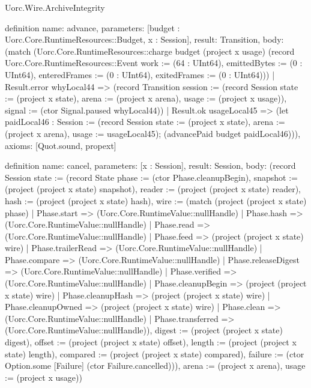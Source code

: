 \begin{lexlean}{Uorc.Wire.ArchiveIntegrity}
\begin{semanticmodule}
definition{
  name: advance,
  parameters: [budget : Uorc.Core.RuntimeResources::Budget, x : Session],
  result: Transition,
  body: (match (Uorc.Core.RuntimeResources::charge budget (project x usage) (record Uorc.Core.RuntimeResources::Event {work := (64 : UInt64), emittedBytes := (0 : UInt64), enteredFrames := (0 : UInt64), exitedFrames := (0 : UInt64)}))
    | Result.error whyLocal44 => (record Transition {session := (record Session {state := (project x state), arena := (project x arena), usage := (project x usage)}), signal := (ctor Signal.paused whyLocal44)})
    | Result.ok usageLocal45 => (let paidLocal46 : Session := (record Session {state := (project x state), arena := (project x arena), usage := usageLocal45}); (advancePaid budget paidLocal46))),
  axioms: [Quot.sound, propext]
}

definition{
  name: cancel,
  parameters: [x : Session],
  result: Session,
  body: (record Session {state := (record State {phase := (ctor Phase.cleanupBegin), snapshot := (project (project x state) snapshot), reader := (project (project x state) reader), hash := (project (project x state) hash), wire := (match (project (project x state) phase)
    | Phase.start => (Uorc.Core.RuntimeValue::nullHandle)
    | Phase.hash => (Uorc.Core.RuntimeValue::nullHandle)
    | Phase.read => (Uorc.Core.RuntimeValue::nullHandle)
    | Phase.feed => (project (project x state) wire)
    | Phase.trailerRead => (Uorc.Core.RuntimeValue::nullHandle)
    | Phase.compare => (Uorc.Core.RuntimeValue::nullHandle)
    | Phase.releaseDigest => (Uorc.Core.RuntimeValue::nullHandle)
    | Phase.verified => (Uorc.Core.RuntimeValue::nullHandle)
    | Phase.cleanupBegin => (project (project x state) wire)
    | Phase.cleanupHash => (project (project x state) wire)
    | Phase.cleanupOwned => (project (project x state) wire)
    | Phase.clean => (Uorc.Core.RuntimeValue::nullHandle)
    | Phase.transferred => (Uorc.Core.RuntimeValue::nullHandle)), digest := (project (project x state) digest), offset := (project (project x state) offset), length := (project (project x state) length), compared := (project (project x state) compared), failure := (ctor Option.some [Failure] (ctor Failure.cancelled))}), arena := (project x arena), usage := (project x usage)})
}


\end{semanticmodule}
\end{lexlean}
